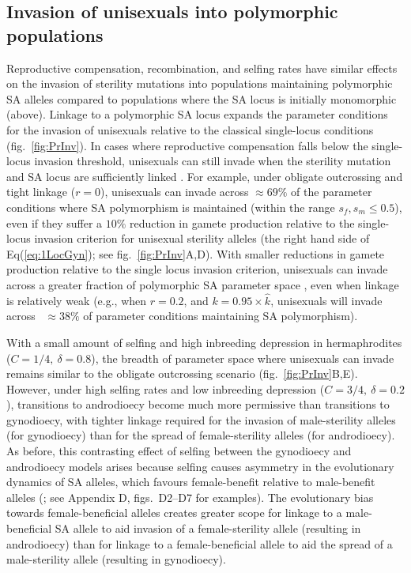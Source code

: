 \documentclass{article}
\newcommand\hl[1]{%
  \bgroup
  \hskip0pt\color{blue!80!black}%
  #1%
  \egroup
}
\begin{document}
\subsection*{Invasion of unisexuals into polymorphic populations}

\hl{Reproductive compensation, recombination, and selfing rates have similar effects on the invasion of sterility mutations into populations maintaining polymorphic SA alleles compared to populations where the SA locus is initially monomorphic (above). Linkage to a polymorphic SA locus expands the parameter conditions for the invasion of unisexuals relative to the classical single-locus conditions (fig.~\ref{fig:PrInv}). In cases where reproductive compensation falls below the single-locus invasion threshold, unisexuals can still invade when the sterility mutation and SA locus are sufficiently linked}. For example, under obligate outcrossing and tight linkage ($r = 0$), unisexuals can invade across $\approx 69\%$ of the parameter conditions where SA polymorphism is maintained (within the range $s_f,s_m \leq 0.5$), even if they suffer a  $10\%$ reduction in gamete production relative to the single-locus invasion criterion for unisexual sterility alleles (the right hand side of Eq(\ref{eq:1LocGyn}); see fig.~\ref{fig:PrInv}A,D). With smaller reductions in gamete production relative to the single locus invasion criterion, unisexuals can invade across a greater fraction of \hl{polymorphic SA parameter space}, even when linkage is relatively weak (e.g.,  when $r = 0.2$, and $k = 0.95 \times \hat{k}$, unisexuals will invade across ~$\approx 38\%$ of parameter conditions maintaining SA polymorphism). 

With a small amount of selfing and high inbreeding depression in hermaphrodites ($C = 1/4,~\delta = 0.8$), \hl{the breadth of parameter space where unisexuals can invade remains} similar to the obligate outcrossing scenario (fig.~\ref{fig:PrInv}B,E). However, under high selfing rates and low inbreeding depression ($C = 3/4,~\delta = 0.2$), transitions to androdioecy become much more permissive than transitions to gynodioecy, with tighter linkage required for the invasion of male-sterility alleles (for gynodioecy) than for the spread of female-sterility alleles (for androdioecy). As before, this contrasting effect of selfing between the gynodioecy and androdioecy models arises because selfing causes asymmetry in the evolutionary dynamics of SA alleles, which favours female-benefit relative to male-benefit alleles (\citealt{ Charlesworth1978a, JordanConnallon2014}; see Appendix D, figs.~D2--D7 for examples). \hl{The evolutionary bias towards female-beneficial alleles creates greater scope for linkage to a male-beneficial SA allele to aid invasion of a female-sterility allele (resulting in androdioecy) than for linkage to a female-beneficial allele to aid the spread of a male-sterility allele (resulting in gynodioecy).}
\end{document}
